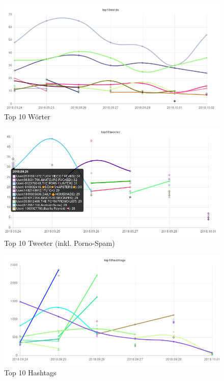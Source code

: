 \begin{figure}
\centering
\includegraphics[width=\textwidth]{bilder/BilderAnalyse-img4.png}
\caption{Top 10 Wörter}
\end{figure}
\begin{figure}
\centering
\includegraphics[width=\textwidth]{bilder/BilderAnalyse-img5.png}
\caption{Top 10 Tweeter (inkl. Porno-Spam)}
\end{figure}
\begin{figure}
\centering
\includegraphics[width=\textwidth]{bilder/BilderAnalyse-img6.png}
\caption{Top 10 Hashtags}
\end{figure}

